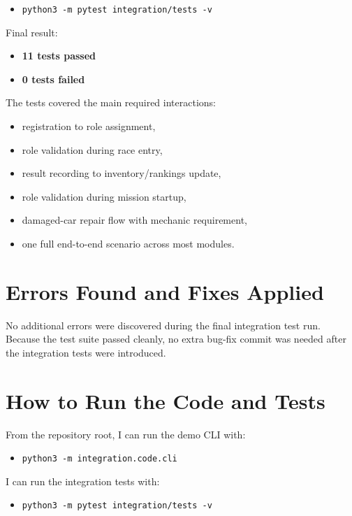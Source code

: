 \documentclass[12pt]{article}
\begin{document}
\begin{itemize}
  \item \texttt{python3 -m pytest integration/tests -v}
\end{itemize}

Final result:

\begin{itemize}
  \item \textbf{11 tests passed}
  \item \textbf{0 tests failed}
\end{itemize}

The tests covered the main required interactions:

\begin{itemize}
  \item registration to role assignment,
  \item role validation during race entry,
  \item result recording to inventory/rankings update,
  \item role validation during mission startup,
  \item damaged-car repair flow with mechanic requirement,
  \item one full end-to-end scenario across most modules.
\end{itemize}

\section{Errors Found and Fixes Applied}
No additional errors were discovered during the final integration test run. Because the test suite passed cleanly, no extra bug-fix commit was needed after the integration tests were introduced.

\section{How to Run the Code and Tests}
From the repository root, I can run the demo CLI with:

\begin{itemize}
  \item \texttt{python3 -m integration.code.cli}
\end{itemize}

I can run the integration tests with:

\begin{itemize}
  \item \texttt{python3 -m pytest integration/tests -v}
\end{itemize}
\end{document}
